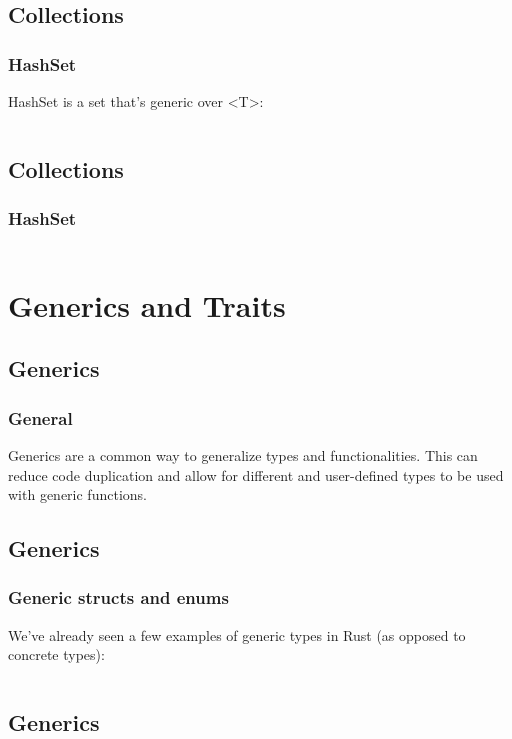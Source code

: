 \documentclass[usenames,twocolumn,dvipsnames,10pt,a4wide]{article}
\begin{document}
\subsection{Collections}
	\subsubsection{HashSet}
	HashSet is a set that's generic over <T>:
	\inputminted[fontsize=\normalsize]{rust}{code/hashset.rs}


\subsection{Collections}
	\subsubsection{HashSet}
	\inputminted[fontsize=\normalsize]{rust}{code/hashset1.rs}



\section{Generics and Traits}

\subsection{Generics}
	\subsubsection{General}
	Generics are a common way to generalize types and
	functionalities. This can reduce code duplication and
	allow for different and user-defined types to be
	used with generic functions.


\subsection{Generics}
	\subsubsection{Generic structs and enums}
	We've already seen a few examples of generic types
	in Rust (as opposed to concrete types): 
	\inputminted[fontsize=\normalsize]{rust}{code/generics1.rs}


\subsection{Generics}
\end{document}
